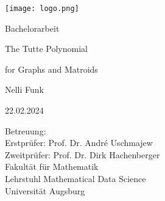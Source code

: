 \documentclass[12pt,a4paper, twoside, autooneside=false]{scrartcl}
\theoremstyle{definition}
\theoremstyle{remark}
\numberwithin{equation}{section}
\begin{document}
     \cfoot{}
     \chead{}
     \ofoot{}
  \begin{titlepage}
  \thispagestyle{empty}
    \texttt{[image: logo.png]} 
    \vspace*{1cm} 

 \begin{center} \large 
    
    Bachelorarbeit
    \vspace*{2cm}

    {\huge The Tutte Polynomial}
    
    \vspace*{0.3cm}
    
    {\Large for Graphs and Matroids}
    
    \vspace*{1.5cm}

    Nelli Funk
    \vspace*{1.5cm}

    22.02.2024
    \vspace*{2cm}


    Betreuung:\\ Erstprüfer: Prof. Dr. André Uschmajew \\ Zweitprüfer: Prof. Dr. Dirk Hachenberger \\[1cm]
    Fakultät für Mathematik \\ 
    Lehrstuhl Mathematical Data Science \\[1cm]
		Universität Augsburg
  \end{center}
\end{titlepage}



\newpage\null\thispagestyle{empty}\newpage
 \tableofcontents
\newpage
   \rehead{\rightmark}
   \lohead{\leftmark}
   \ohead*{\pagemark}
\end{document}
